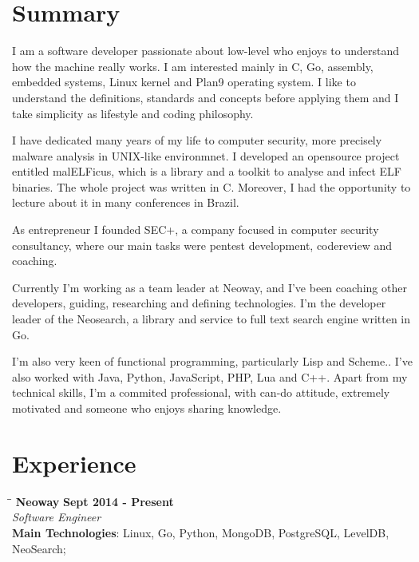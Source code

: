 \documentclass[margin]{res}
\begin{document}
  

\address{Florianopolis, SC, Brazil\\ tiago4orion@gmail.com \\ Phone: +55 4891051337 \\ Post Code: 88064-612 }
                           
                        
\begin{resume}                        
 
\section{Summary}  I am a software developer passionate about low-level who enjoys to understand how the machine really works. I am interested mainly in C, Go, assembly, embedded systems, Linux kernel and Plan9 operating system. I like to understand the definitions, standards and concepts before applying them and I take simplicity as lifestyle and coding philosophy.

I have dedicated many years of my life to computer security, more precisely malware analysis in UNIX-like environmnet. I developed an opensource project entitled malELFicus, which is a library and a toolkit to analyse and infect ELF binaries. The whole project was written in C. Moreover, I had the opportunity to lecture about it in many conferences in Brazil.

As entrepreneur I founded SEC+, a company focused in computer security consultancy, where our main tasks were pentest development, codereview and coaching.

Currently I'm working as a team leader at Neoway, and I've been coaching other developers, guiding, researching and defining technologies. I'm the developer leader of the Neosearch, a library and service to full text search engine written in Go.

I'm also  very keen of functional programming, particularly Lisp and Scheme.. I've also worked with Java, Python, JavaScript, PHP, Lua and C++. Apart from my technical skills, I'm a commited professional, with can-do attitude, extremely motivated and someone who enjoys sharing knowledge. 

\section{Experience}

\vspace{-0.1in}
   \begin{tabbing}
   \hspace{2.3in}\= \hspace{1.7in}\= \kill %
    \textbf{Neoway}    \>\>\textbf{Sept 2014 - Present}\\
    \textit{Software Engineer}\\        
    \textbf{Main Technologies}: Linux, Go, Python, MongoDB, PostgreSQL, LevelDB, NeoSearch;
   \end{tabbing}\vspace{-20pt}      %
    \vspace{2mm}
  

\end{resume}
\end{document}
